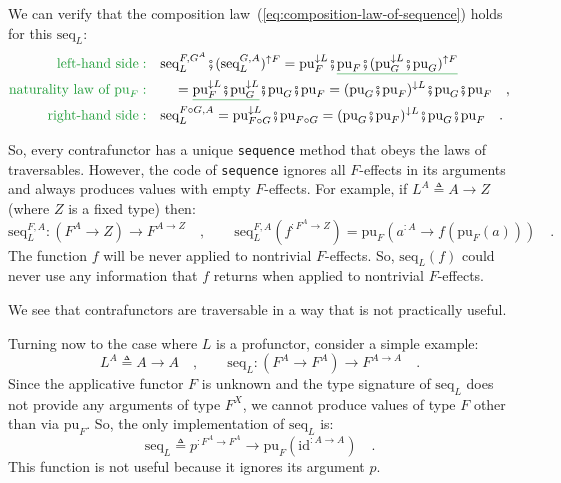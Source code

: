 We can verify that the composition law~(\ref{eq:composition-law-of-sequence})
holds for this $\text{seq}_{L}$:
\begin{align*}
{\color{greenunder}\text{left-hand side}:}\quad & \text{seq}_{L}^{F,G^{A}}\bef(\text{seq}_{L}^{G,A})^{\uparrow F}=\text{pu}_{F}^{\downarrow L}\bef\gunderline{\text{pu}_{F}\bef(\text{pu}_{G}^{\downarrow L}\bef\text{pu}_{G})^{\uparrow F}}\\
{\color{greenunder}\text{naturality law of }\text{pu}_{F}:}\quad & \quad=\gunderline{\text{pu}_{F}^{\downarrow L}\bef\text{pu}_{G}^{\downarrow L}}\bef\text{pu}_{G}\bef\text{pu}_{F}=(\text{pu}_{G}\bef\text{pu}_{F})^{\downarrow L}\bef\text{pu}_{G}\bef\text{pu}_{F}\quad,\\
{\color{greenunder}\text{right-hand side}:}\quad & \text{seq}_{L}^{F\circ G,A}=\text{pu}_{F\circ G}^{\downarrow L}\bef\text{pu}_{F\circ G}=(\text{pu}_{G}\bef\text{pu}_{F})^{\downarrow L}\bef\text{pu}_{G}\bef\text{pu}_{F}\quad.
\end{align*}

So, every contrafunctor has a unique \lstinline!sequence! method
that obeys the laws of traversables. However, the code of \lstinline!sequence!
ignores all $F$-effects in its arguments and always produces values
with empty $F$-effects. For example, if $L^{A}\triangleq A\rightarrow Z$
(where $Z$ is a fixed type) then:
\[
\text{seq}_{L}^{F,A}:(F^{A}\rightarrow Z)\rightarrow F^{A\rightarrow Z}\quad,\quad\quad\text{seq}_{L}^{F,A}(f^{:F^{A}\rightarrow Z})=\text{pu}_{F}(a^{:A}\rightarrow f(\text{pu}_{F}(a)))\quad.
\]
The function $f$ will be never applied to nontrivial $F$-effects.
So, $\text{seq}_{L}(f)$ could never use any information that $f$
returns when applied to nontrivial $F$-effects. 

We see that contrafunctors are traversable in a way that is not practically
useful.

Turning now to the case where $L$ is a profunctor, consider a simple
example:
\[
L^{A}\triangleq A\rightarrow A\quad,\quad\quad\text{seq}_{L}:(F^{A}\rightarrow F^{A})\rightarrow F^{A\rightarrow A}\quad.
\]
Since the applicative functor $F$ is unknown and the type signature
of $\text{seq}_{L}$ does not provide any arguments of type $F^{X}$,
we cannot produce values of type $F$ other than via $\text{pu}_{F}$.
So, the only implementation of $\text{seq}_{L}$ is:
\[
\text{seq}_{L}\triangleq p^{:F^{A}\rightarrow F^{A}}\rightarrow\text{pu}_{F}(\text{id}^{:A\rightarrow A})\quad.
\]
This function is not useful because it ignores its argument $p$.

